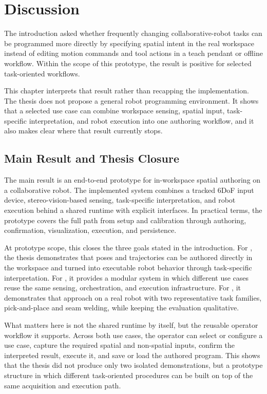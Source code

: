 \chapter{Discussion} \label{chapter:ch6_discussion}

The introduction asked whether frequently changing collaborative-robot tasks can be programmed more directly by specifying spatial intent in the real workspace instead of editing motion commands and tool actions in a teach pendant or offline workflow. Within the scope of this prototype, the result is positive for selected task-oriented workflows.

This chapter interprets that result rather than recapping the implementation. The thesis does not propose a general robot programming environment. It shows that a selected use case can combine workspace sensing, spatial input, task-specific interpretation, and robot execution into one authoring workflow, and it also makes clear where that result currently stops.

\section{Main Result and Thesis Closure}

The main result is an end-to-end prototype for in-workspace spatial authoring on a collaborative robot. The implemented system combines a tracked 6DoF input device, stereo-vision-based sensing, task-specific interpretation, and robot execution behind a shared runtime with explicit interfaces. In practical terms, the prototype covers the full path from setup and calibration through authoring, confirmation, visualization, execution, and persistence.

At prototype scope, this closes the three goals stated in the introduction. For , the thesis demonstrates that poses and trajectories can be authored directly in the workspace and turned into executable robot behavior through task-specific interpretation. For , it provides a modular system in which different use cases reuse the same sensing, orchestration, and execution infrastructure. For , it demonstrates that approach on a real robot with two representative task families, pick-and-place and seam welding, while keeping the evaluation qualitative.

What matters here is not the shared runtime by itself, but the reusable operator workflow it supports. Across both use cases, the operator can select or configure a use case, capture the required spatial and non-spatial inputs, confirm the interpreted result, execute it, and save or load the authored program. This shows that the thesis did not produce only two isolated demonstrations, but a prototype structure in which different task-oriented procedures can be built on top of the same acquisition and execution path.

